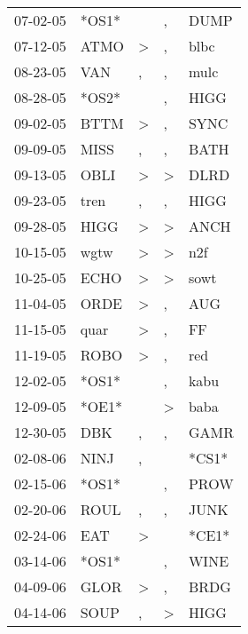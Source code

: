 \begin{supertabular}{lllll}
 07-02-05 &  *OS1* &                  &                , &   DUMP \\
 07-12-05 &   ATMO &     \textgreater &                , &   blbc \\
 08-23-05 &    VAN &                , &                , &   mulc \\
 08-28-05 &  *OS2* &                  &                , &   HIGG \\
 09-02-05 &   BTTM &     \textgreater &                , &   SYNC \\
 09-09-05 &   MISS &                , &                , &   BATH \\
 09-13-05 &   OBLI &     \textgreater &     \textgreater &   DLRD \\
 09-23-05 &   tren &                , &                , &   HIGG \\
 09-28-05 &   HIGG &     \textgreater &     \textgreater &   ANCH \\
 10-15-05 &   wgtw &     \textgreater &     \textgreater &    n2f \\
 10-25-05 &   ECHO &     \textgreater &     \textgreater &   sowt \\
 11-04-05 &   ORDE &     \textgreater &                , &    AUG \\
 11-15-05 &   quar &     \textgreater &                , &     FF \\
 11-19-05 &   ROBO &     \textgreater &                , &    red \\
 12-02-05 &  *OS1* &                  &                , &   kabu \\
 12-09-05 &  *OE1* &                  &     \textgreater &   baba \\
 12-30-05 &    DBK &                , &                , &   GAMR \\
 02-08-06 &   NINJ &                , &                  &  *CS1* \\
 02-15-06 &  *OS1* &                  &                , &   PROW \\
 02-20-06 &   ROUL &                , &                , &   JUNK \\
 02-24-06 &    EAT &     \textgreater &                  &  *CE1* \\
 03-14-06 &  *OS1* &                  &                , &   WINE \\
 04-09-06 &   GLOR &     \textgreater &                , &   BRDG \\
 04-14-06 &   SOUP &                , &     \textgreater &   HIGG \\

\end{supertabular}

